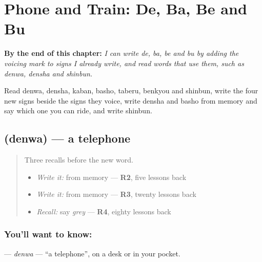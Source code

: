 
\chapter{Phone and Train: De, Ba, Be and Bu}
\label{ch:ja-phone-and-train-de-ba-be-bu}

\begin{chapteropening}
\textbf{By the end of this chapter:} \emph{I can write de, ba, be and bu by adding the voicing mark to signs I already write, and read words that use them, such as denwa, densha and shinbun.}

Read denwa, densha, kaban, basho, taberu, benkyou and shinbun, write the four new signs beside the signs they voice, write densha and basho from memory and say which one you can ride, and write shinbun.
\end{chapteropening}

\section[\texorpdfstring{\ja{でんわ} (denwa)}{でんわ (denwa)}]{ (denwa) — a telephone}

\label{lesson:JA-C134-denwa}



\begin{quote}
Three recalls before the new word.

\begin{itemize}
\raggedright
  \item \emph{Write it:} \textbf{} from memory — \textbf{R2}, five lessons back
  \item \emph{Write it:} \textbf{} from memory — \textbf{R3}, twenty lessons back
  \item \emph{Recall:} say \emph{grey} — \textbf{R4}, eighty lessons back
\end{itemize}
\end{quote}

\subsection*{You'll want to know: }
\textbf{} — \emph{denwa} — \textquotedblleft{}a telephone\textquotedblright{}, on a desk or in your pocket.

